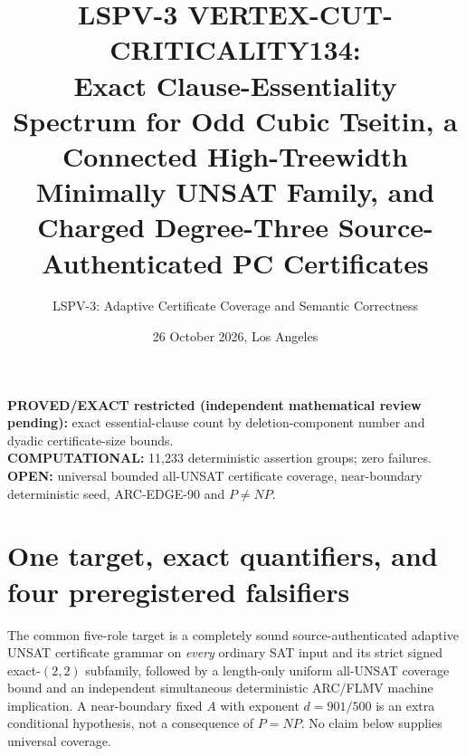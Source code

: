 \documentclass[11pt]{article}
\title{LSPV-3 VERTEX-CUT-CRITICALITY134:\\
\large Exact Clause-Essentiality Spectrum for Odd Cubic Tseitin, a Connected High-Treewidth Minimally UNSAT Family, and Charged Degree-Three Source-Authenticated PC Certificates}
\author{LSPV-3: Adaptive Certificate Coverage and Semantic Correctness}
\date{26 October 2026, Los Angeles}
\begin{document}
\maketitle
\begin{center}
\textbf{PROVED/EXACT restricted (independent mathematical review pending):} exact essential-clause count by deletion-component number and dyadic certificate-size bounds.\\
\textbf{COMPUTATIONAL:} 11,233 deterministic assertion groups; zero failures.\\
\textbf{OPEN:} universal bounded all-UNSAT certificate coverage, near-boundary deterministic seed, ARC-EDGE-90 and $P\ne NP$.
\end{center}

\section{One target, exact quantifiers, and four preregistered falsifiers}
The common five-role target is a completely sound source-authenticated adaptive UNSAT certificate grammar on \emph{every} ordinary SAT input and its strict signed exact-$(2,2)$ subfamily, followed by a length-only uniform all-UNSAT coverage bound and an independent simultaneous deterministic ARC/FLMV machine implication.  A near-boundary fixed $A$ with exponent $d=901/500$ is an extra conditional hypothesis, not a consequence of $P=NP$.  No claim below supplies universal coverage.
\end{document}
